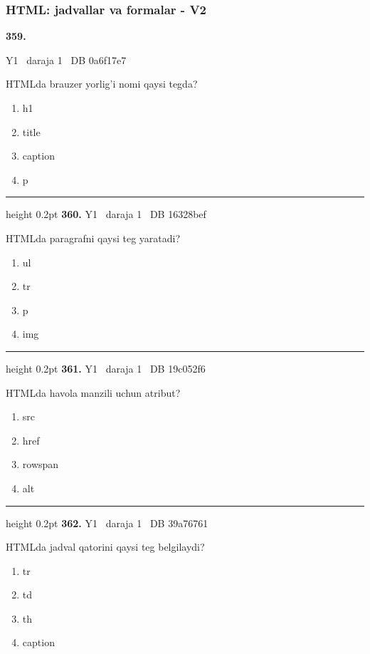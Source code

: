 \documentclass[10pt,a4paper,oneside]{article}
\begin{document}
\subsubsection{HTML: jadvallar va formalar - V2}
\hypertarget{q359}{\textbf{\color{ink}359.}}  {\color{muted}\scriptsize Y1 \textbullet\ daraja 1 \textbullet\ DB 0a6f17e7}
\par
HTMLda brauzer yorlig'i nomi qaysi tegda?
\begin{enumerate}[label=\Alph*),leftmargin=9mm]
\item h1
\item title
\item caption
\item p
\end{enumerate}
\vspace{2mm}\hrule height 0.2pt \vspace{4mm}
\hypertarget{q360}{\textbf{\color{ink}360.}}  {\color{muted}\scriptsize Y1 \textbullet\ daraja 1 \textbullet\ DB 16328bef}
\par
HTMLda paragrafni qaysi teg yaratadi?
\begin{enumerate}[label=\Alph*),leftmargin=9mm]
\item ul
\item tr
\item p
\item img
\end{enumerate}
\vspace{2mm}\hrule height 0.2pt \vspace{4mm}
\hypertarget{q361}{\textbf{\color{ink}361.}}  {\color{muted}\scriptsize Y1 \textbullet\ daraja 1 \textbullet\ DB 19c052f6}
\par
HTMLda havola manzili uchun atribut?
\begin{enumerate}[label=\Alph*),leftmargin=9mm]
\item src
\item href
\item rowspan
\item alt
\end{enumerate}
\vspace{2mm}\hrule height 0.2pt \vspace{4mm}
\hypertarget{q362}{\textbf{\color{ink}362.}}  {\color{muted}\scriptsize Y1 \textbullet\ daraja 1 \textbullet\ DB 39a76761}
\par
HTMLda jadval qatorini qaysi teg belgilaydi?
\begin{enumerate}[label=\Alph*),leftmargin=9mm]
\item tr
\item td
\item th
\item caption
\end{enumerate}
\end{document}
